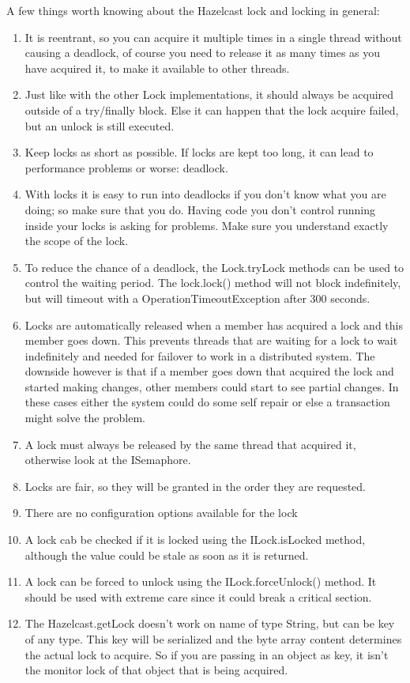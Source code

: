 A few things worth knowing about the Hazelcast lock and locking in general:
\begin{enumerate}
\item It is reentrant, so you can acquire it multiple times in a single thread without causing a deadlock, of course you need to release it as many times as you have acquired it, to make it available to other threads.
\item Just like with the other Lock implementations, it should always be acquired outside of a try/finally block. Else it can happen that the lock acquire failed, but an unlock is still executed. 
\item Keep locks as short as possible. If locks are kept too long, it can lead to performance problems or worse: deadlock.
\item With locks it is easy to run into deadlocks if you don't know what you are doing; so make sure that you do. Having code you don't control running inside your locks is asking for problems. Make sure you understand exactly the scope of the lock. 
\item To reduce the chance of a deadlock, the Lock.tryLock methods can be used to control the waiting period. The lock.lock() method will not block indefinitely, but will timeout with a OperationTimeoutException after 300 seconds.  
\item Locks are automatically released when a member has acquired a lock and this member goes down. This prevents threads that are waiting for a lock to wait indefinitely and needed for failover to work in a distributed system. The downside however is that if a member goes down that acquired the lock and started making changes, other members could start to see partial changes. In these cases either the system could do some self repair or else a transaction might solve the problem.
\item A lock must always be released by the same thread that acquired it, otherwise look at the ISemaphore.
\item Locks are fair, so they will be granted in the order they are requested.
\item There are no configuration options available for the lock
\item A lock cab be checked if it is locked using the ILock.isLocked method, although the value could be stale as soon as it is returned.
\item A lock can be forced to unlock using the ILock.forceUnlock() method. It should be used with extreme care since it could break a critical section. 
\item The Hazelcast.getLock doesn't work on name of type String, but can be key of any type. This key will be serialized and the byte array content determines the actual lock to acquire. So if you are passing in an object as key, it isn't the monitor lock of that object that is being acquired.
\end{enumerate}

